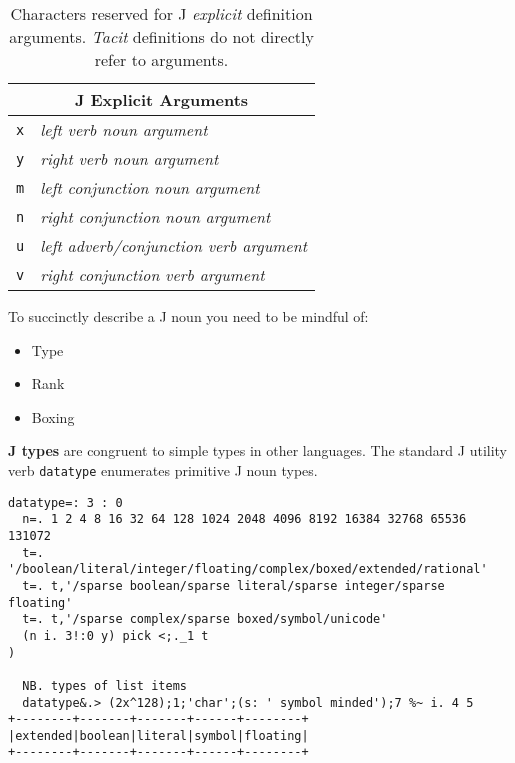 \begin{table}[htbp]
  \centering
   \scriptsize
\begin{tabular}{|l|l|} \hline
   \multicolumn{2}{|c|}{\textbf{\normalsize J Explicit Arguments\T\B}} \\ \hline
   \texttt{x\T\B} & \textcolor{CodeComment}{\ttfamily\textsl{left verb noun argument}}  \\
   \texttt{y\T\B} & \textcolor{CodeComment}{\ttfamily\textsl{right verb noun argument}} \\ 
   \texttt{m\T\B} & \textcolor{CodeComment}{\ttfamily\textsl{left conjunction noun argument}} \\ 
   \texttt{n\T\B} & \textcolor{CodeComment}{\ttfamily\textsl{right conjunction noun argument}} \\ 
   \texttt{u\T\B} & \textcolor{CodeComment}{\ttfamily\textsl{left adverb/conjunction verb argument}} \\ 
   \texttt{v\T\B} & \textcolor{CodeComment}{\ttfamily\textsl{right conjunction verb argument}}  \\ \hline
\end{tabular}
   \caption[J Arguments]{Characters reserved for J \emph{explicit} definition arguments. \emph{Tacit} definitions do
   not directly refer to arguments.}
   \label{tab:jargs}
\end{table}

To succinctly describe a J noun you need to be mindful of:
\begin{itemize}
	\item Type
	\item Rank
	\item Boxing
\end{itemize}

\textbf{J types} are congruent to simple types in other languages.  The standard J utility verb \texttt{datatype} enumerates primitive J noun types.

\begin{lstlisting}[frame=single,framerule=0pt,basicstyle=\ttfamily\footnotesize] 
datatype=: 3 : 0
  n=. 1 2 4 8 16 32 64 128 1024 2048 4096 8192 16384 32768 65536 131072
  t=. '/boolean/literal/integer/floating/complex/boxed/extended/rational'
  t=. t,'/sparse boolean/sparse literal/sparse integer/sparse floating'
  t=. t,'/sparse complex/sparse boxed/symbol/unicode'
  (n i. 3!:0 y) pick <;._1 t
)

  NB. types of list items
  datatype&.> (2x^128);1;'char';(s: ' symbol minded');7 %~ i. 4 5
+--------+-------+-------+------+--------+
|extended|boolean|literal|symbol|floating|
+--------+-------+-------+------+--------+
\end{lstlisting}  

